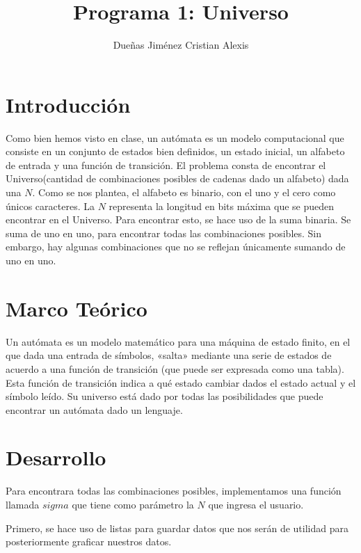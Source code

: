 \documentclass{article}
\title{Programa 1: Universo}
\author{Dueñas Jiménez Cristian Alexis}
\begin{document}
\maketitle

\section{Introducción}
Como bien hemos visto en clase, un autómata es un modelo computacional que consiste en un conjunto de estados bien definidos, un estado inicial, un alfabeto de entrada y una función de transición. El problema consta de encontrar el Universo(cantidad de combinaciones posibles de cadenas dado un alfabeto) dada una $N$. Como se nos plantea, el alfabeto es binario, con el uno y el cero como únicos caracteres. La $N$ representa la longitud en bits máxima que se pueden encontrar en el Universo. Para encontrar esto, se hace uso de la suma binaria. Se suma de uno en uno, para encontrar todas las combinaciones posibles. Sin embargo, hay algunas combinaciones que no se reflejan únicamente sumando de uno en uno. 
\section{Marco Teórico}
Un autómata es un modelo matemático para una máquina de estado finito, en el que dada una entrada de símbolos, «salta» mediante una serie de estados de acuerdo a una función de transición (que puede ser expresada como una tabla). Esta función de transición indica a qué estado cambiar dados el estado actual y el símbolo leído. Su universo está dado por todas las posibilidades que puede encontrar un autómata dado un lenguaje.
\section{Desarrollo}
Para encontrara todas las combinaciones posibles, implementamos una función llamada $sigma$ que tiene como parámetro la $N$ que ingresa el usuario. 

Primero, se hace uso de listas para guardar datos que nos serán de utilidad para posteriormente graficar nuestros datos.
\end{document}
